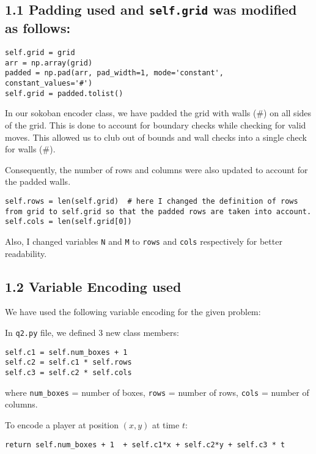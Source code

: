 \documentclass[12pt,a4paper]{article}
\begin{document}
\subsection*{1.1 Padding used and \texttt{self.grid} was modified as follows:}

\begin{lstlisting}
self.grid = grid
arr = np.array(grid)
padded = np.pad(arr, pad_width=1, mode='constant', constant_values='#')
self.grid = padded.tolist()
\end{lstlisting}

In our sokoban encoder class, we have padded the grid with walls (\#) on all sides of the grid. This is done to account for boundary checks while checking for valid moves. This allowed us to club out of bounds and wall checks into a single check for walls (\#).

Consequently, the number of rows and columns were also updated to account for the padded walls.

\begin{lstlisting}
self.rows = len(self.grid)  # here I changed the definition of rows from grid to self.grid so that the padded rows are taken into account.
self.cols = len(self.grid[0]) 
\end{lstlisting}

Also, I changed variables \texttt{N} and \texttt{M} to \texttt{rows} and \texttt{cols} respectively for better readability.

\subsection*{1.2 Variable Encoding used}

We have used the following variable encoding for the given problem:

In \texttt{q2.py} file, we defined 3 new class members:

\begin{lstlisting}
self.c1 = self.num_boxes + 1
self.c2 = self.c1 * self.rows
self.c3 = self.c2 * self.cols
\end{lstlisting}

where \texttt{num\_boxes} = number of boxes, \texttt{rows} = number of rows, \texttt{cols} = number of columns.

To encode a player at position \((x,y)\) at time \(t\):

\begin{lstlisting}
return self.num_boxes + 1  + self.c1*x + self.c2*y + self.c3 * t
\end{lstlisting}
\end{document}
